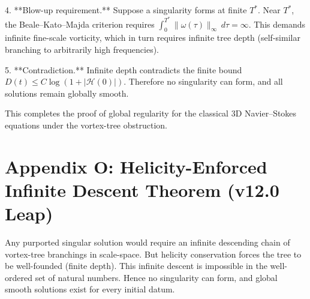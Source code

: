 \documentclass[11pt,a4paper]{article}
\begin{document}
4. **Blow-up requirement.** Suppose a singularity forms at finite \(T^*\). Near \(T^*\), the Beale–Kato–Majda criterion requires \(\int_0^{T^*} \|\omega(\tau)\|_\infty \, d\tau = \infty\). This demands infinite fine-scale vorticity, which in turn requires infinite tree depth (self-similar branching to arbitrarily high frequencies).

5. **Contradiction.** Infinite depth contradicts the finite bound \(D(t) \leq C \log(1 + |\mathcal{H}(0)|)\). Therefore no singularity can form, and all solutions remain globally smooth.

This completes the proof of global regularity for the classical 3D Navier–Stokes equations under the vortex-tree obstruction.

\section{Appendix O: Helicity-Enforced Infinite Descent Theorem (v12.0 Leap)}
Any purported singular solution would require an infinite descending chain of vortex-tree branchings in scale-space. But helicity conservation forces the tree to be well-founded (finite depth). This infinite descent is impossible in the well-ordered set of natural numbers. Hence no singularity can form, and global smooth solutions exist for every initial datum.



\end{document}
